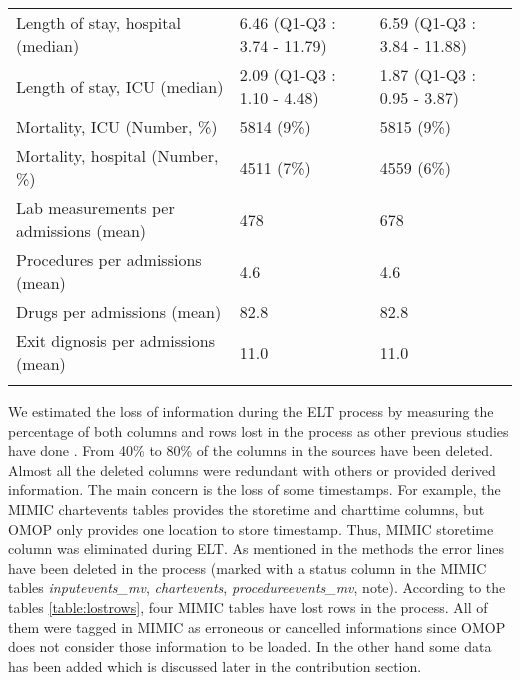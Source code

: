 \begin{table*}[t]
\begin{tabular}{@{}lll@{}}
Length of stay, hospital (median)      & 6.46 (Q1-Q3 : 3.74 - 11.79) & 6.59 (Q1-Q3 : 3.84 - 11.88)        \\
Length of stay, ICU (median)           & 2.09 (Q1-Q3 : 1.10 - 4.48)  & 1.87 (Q1-Q3 : 0.95 - 3.87)         \\
Mortality, ICU (Number, \%)            & 5814 (9\%)                  & 5815 (9\%)                         \\
Mortality, hospital (Number, \%)       & 4511 (7\%)                  & 4559 (6\%)                         \\
Lab measurements per admissions (mean) & 478                         & 678                                \\
Procedures per admissions (mean)       & 4.6                         & 4.6                                \\
Drugs per admissions (mean)            & 82.8                        & 82.8                               \\
Exit dignosis per admissions (mean)    & 11.0                        & 11.0                               \\\botrule
\end{tabular}
\label{table:statistics}
\end{table*}


%
%
We estimated the loss of information during the ELT process by measuring the
percentage of both columns and rows lost in the process as other previous
studies have done \cite{omop-nashville}.
From 40\% to 80\% of the columns in the sources have been deleted. Almost
all the deleted columns were redundant with others or provided derived
information. The main concern is the loss of some timestamps. For example, the
MIMIC chartevents tables provides the storetime and charttime columns, but OMOP
only provides one location to store timestamp. Thus, MIMIC storetime column was
eliminated during ELT. As mentioned in the methods the error lines have been
deleted in the process (marked with a status column in the MIMIC tables
\textit{inputevents\_mv}, \textit{chartevents}, \textit{procedureevents\_mv}, note).
According to the tables \ref{table:lostrows}, four MIMIC tables have lost rows in
the process. All of them were tagged in MIMIC as erroneous or cancelled
informations since OMOP does not consider those information to be loaded.
In the other hand some data has been added which is discussed later in the
contribution section.

